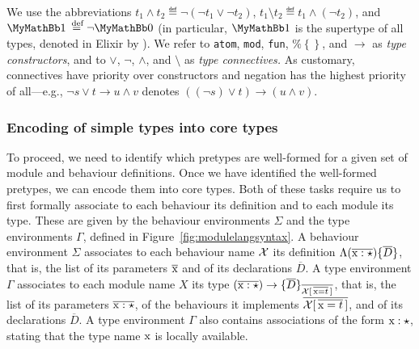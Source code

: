 \documentclass[a4paper,10pt]{article}
\begin{document}
We use the abbreviations
$
  t_1 \land t_2 \eqdef \lnot (\lnot t_1 \lor \lnot t_2)
$, $
  t_1 \setminus t_2 \eqdef t_1 \land (\lnot t_2)
$, and $
  \Any \eqdef \lnot \Empty
$ (in particular, $\Any$ is the supertype of all types, denoted in Elixir by ).
We refer to \texttt{atom}, \texttt{mod}, \texttt{fun}, $\texttt{\%}\!\left\{\right\}$, and $ \to $ as \emph{type
constructors}, and to $ \lor $, $ \lnot $, $ \land $, and $ \setminus
$ as \emph{type connectives.} As customary, connectives have priority
over constructors and negation has the highest priority of all---e.g., $\neg
s{\vee}t\to u{\wedge}v$ denotes $((\neg s){\vee}t)\to (u{\wedge}v)$.

\subsubsection{Encoding of simple types into core types}\label{sec:encoding}
To proceed, we need to identify which pretypes are well-formed for a given set of module and behaviour definitions. Once we have identified the well-formed pretypes, we can encode them into core types. Both of these tasks require us to first formally associate to each behaviour its definition and to each module its type. These are given by the behaviour environments $\Sigma$ and the type environments $\Gamma$, defined in Figure~\ref{fig:modulelangsyntax}. A behaviour environment $\Sigma$ associates to each behaviour name $\mathcal{X}$ its definition $\Lambda(\overline{\text{\rm x}:\star})\{\overline D\}$, that is, the list of its parameters $\overline{\text{\rm x}}$ and of its declarations $\overline D$. A type environment $\Gamma$ associates to each module name $X$ its type $(\overline{\text{\rm x}:\star})\to\{\overline{D}\}_{\overline{\mathcal{X}[\,\overline{\text{\rm x}=t}\,]}}$, that is, the list of its parameters $\overline{\text{\rm x}:\star}$, of the behaviours it implements $\overline{\mathcal{X}[\,\overline{\text{\rm x}=t}\,]}$, and of its declarations $\overline D$. A type environment $\Gamma$ also contains associations of the form $\text{\rm x}:\star$, stating that the type name $\text{\rm x}$ is locally available.
\end{document}
